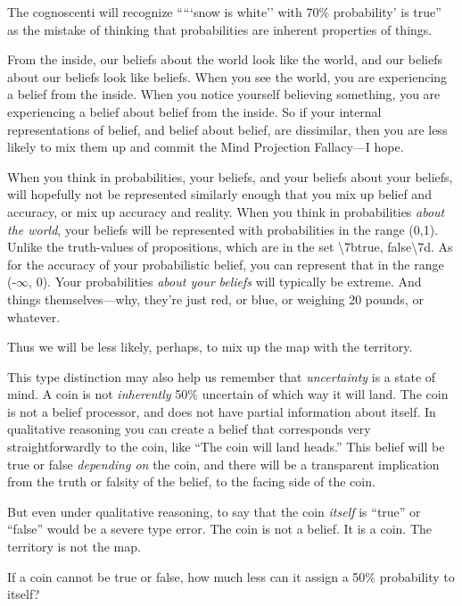 {
 The cognoscenti will recognize
`````snow is
white'' with 70\% probability' is
true'' as the mistake of thinking that probabilities
are inherent properties of things.}

{
 From the inside, our beliefs about the world look like the world,
and our beliefs about our beliefs look like beliefs. When you see the
world, you are experiencing a belief from the inside. When you notice
yourself believing something, you are experiencing a belief about
belief from the inside. So if your internal representations of belief,
and belief about belief, are dissimilar, then you are less likely to
mix them up and commit the Mind Projection Fallacy---I hope.}

{
 When you think in probabilities, your beliefs, and your beliefs
about your beliefs, will hopefully not be represented similarly enough
that you mix up belief and accuracy, or mix up accuracy and reality.
When you think in probabilities \textit{about the world}, your beliefs
will be represented with probabilities in the range (0,1). Unlike the
truth-values of propositions, which are in the set
{\textbackslash}{\textquotesingle}7btrue,
false{\textbackslash}{\textquotesingle}7d. As for the accuracy of your
probabilistic belief, you can represent that in the range (-${\infty}$,
0). Your probabilities \textit{about your} \textit{beliefs} will
typically be extreme. And things themselves---why,
they're just red, or blue, or weighing 20 pounds, or
whatever.}

{
 Thus we will be less likely, perhaps, to mix up the map with the
territory.}

{
 This type distinction may also help us remember that
\textit{uncertainty} is a state of mind. A coin is not
\textit{inherently} 50\% uncertain of which way it will land. The coin
is not a belief processor, and does not have partial information about
itself. In qualitative reasoning you can create a belief that
corresponds very straightforwardly to the coin, like
``The coin will land heads.'' This
belief will be true or false \textit{depending on} the coin, and there
will be a transparent implication from the truth or falsity of the
belief, to the facing side of the coin.}

{
 But even under qualitative reasoning, to say that the coin
\textit{itself} is ``true'' or
``false'' would be a severe type
error. The coin is not a belief. It is a coin. The territory is not the
map.}

{
 If a coin cannot be true or false, how much less can it assign a
50\% probability to itself?}

